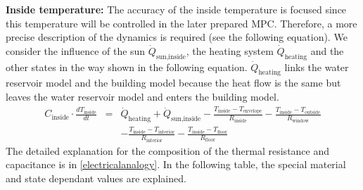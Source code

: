     \textbf{Inside temperature:}\newline
    The accuracy of the inside temperature is focused since this temperature will be controlled in the later prepared MPC. Therefore, a more precise description of the dynamics is required (see the following equation). We consider the influence of the sun $\dot{Q}_\text{sun,inside}$, the heating system $\dot{Q}_\text{heating}$ and the other states in the way shown in the following equation. $\dot{Q}_\text{heating}$ links the water reservoir model and the building model because the heat flow is the same but leaves the water reservoir model and enters the building model. 
    \begin{align}
        \label{eq:1.state}
        C_\text{inside}\cdot \frac{d T_\text{inside}}{d t} &=& \dot{Q}_\text{heating} + \dot{Q}_\text{sun,inside} - \frac{T_\text{inside}-T_\text{envelope}}{R_\text{inside}} - \frac{T_\text{inside}-T_\text{outside}}{R_\text{window}} \\
       & &-\frac{T_\text{inside}-T_\text{interior}}{R_\text{interior}}-\frac{T_\text{inside}-T_\text{floor}}{R_\text{floor}}\nonumber
    \end{align}
    The detailed explanation for the composition of the thermal resistance and capacitance is in \autoref{electricalanalogy}. In the following table, the special material and state dependant values are explained.
